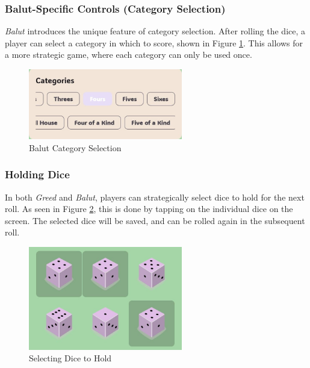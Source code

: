 \subsubsection{Balut-Specific Controls (Category Selection)}

\textit{Balut} introduces the unique feature of category selection. After rolling the dice, a player can select a category in which to score, shown in Figure \ref{fig:control3}. This allows for a more strategic game, where each category can only be used once.

\begin{figure}[ht!]
    \centering
    \includegraphics[width=0.6\textwidth]{img/control3.jpg}
    \caption{Balut Category Selection}
    \label{fig:control3}
\end{figure}

\subsubsection{Holding Dice}

In both \textit{Greed} and \textit{Balut}, players can strategically select dice to hold for the next roll. As seen in Figure \ref{fig:control4}, this is done by tapping on the individual dice on the screen. The selected dice will be saved, and can be rolled again in the subsequent roll.

\begin{figure}[ht!]
    \centering
    \includegraphics[width=0.6\textwidth]{img/control4.jpg}
    \caption{Selecting Dice to Hold}
     \label{fig:control4}
\end{figure}

